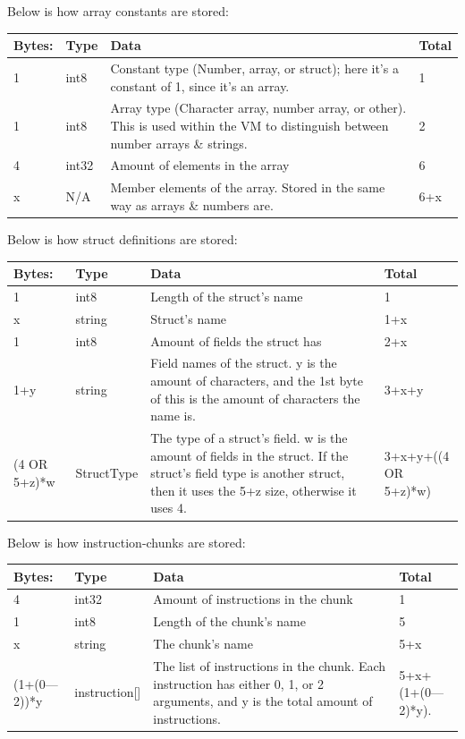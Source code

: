 \documentclass[12pt, letterpaper, oneside]{article}
\begin{document}
	\newline 
	Below is how array constants are stored:
	\newline
	\begin{tabular}{|p{1cm}|p{2cm}|p{10cm}|p{2cm}|}
		\hline
		Bytes:&Type&Data&Total\\
		\hline
		1&int8&Constant type (Number, array, or struct); here it's a constant of 1, since it's an array.&1\\
		\hline 
		1&int8&Array type (Character array, number array, or other). This is used within the VM to distinguish between number arrays \& strings.&2\\
		\hline 
		4&int32&Amount of elements in the array&6\\
		\hline 
		x&N/A&Member elements of the array. Stored in the same way as arrays \& numbers are. &6+x\\
		\hline
	\end{tabular} 
	\newline
	Below is how struct definitions are stored:
	\newline
	\begin{tabular}{|p{1cm}|p{2cm}|p{10cm}|p{2cm}|}
		\hline
		Bytes:&Type&Data&Total\\
		\hline
		1&int8&Length of the struct's name&1\\
		\hline 
		x&string&Struct's name&1+x\\
		\hline 
		1&int8&Amount of fields the struct has&2+x\\
		\hline 
		1+y&string&Field names of the struct. y is the amount of characters, and the 1st byte of this is the amount of characters the name is.&3+x+y\\
		\hline
		(4 OR 5+z)*w&StructType&The type of a struct's field. w is the amount of fields in the struct. If the struct's field type is another struct, then it uses the 5+z size, otherwise it uses 4.&3+x+y+((4 OR 5+z)*w)\\
		\hline
	\end{tabular}
	\newline 
	Below is how instruction-chunks are stored:
	\newline
	\begin{tabular}{|p{1cm}|p{2cm}|p{10cm}|p{2cm}|}
		\hline
		Bytes:&Type&Data&Total\\
		\hline
		4&int32&Amount of instructions in the chunk&1\\
		\hline 
		1&int8&Length of the chunk's name&5\\
		\hline 
		x&string&The chunk's name&5+x\\
		\hline 
		(1+(0---2))*y&instruction[]&The list of instructions in the chunk. Each instruction has either 0, 1, or 2 arguments, and y is the total amount of instructions.&5+x+(1+(0---2)*y).\\
		\hline 
	\end{tabular}
	\newpage
	\label{sec:future}
\end{document}
